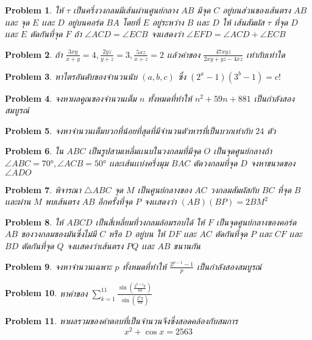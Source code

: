 \documentclass[a4paper,12pt]{article}
\newtheorem{problem}{Problem}
\begin{document}
	\begin{problem}
		ให้ $\tau$ เป็นครึ่งวงกลมมีเส้นผ่านศูนย์กลาง $AB$ มีจุด $C$ อยู่บนส่วนของเส้นตรง $AB$ เเละ จุด $E$ เเละ $D$ อยู่บนคอร์ด $BA$ โดยที่ $E$ อยู่ระหว่าง $B$ เเละ $D$ ให้ เส้นสัมผัส $\tau$ ที่จุด $D$ เเละ $E$ ตัดกันที่จุด $F$ ถ้า $\angle{ACD}= \angle{ECB}$ จงเเสดงว่า $\angle{EFD} = \angle{ACD} + \angle{ECB}$
	\end{problem}
	\begin{problem}
		ถ้า $\frac{3xy}{x+y}=4, \frac{2yz}{y+z}=3, \frac{5xz}{x+z}=2$ เเล้วค่าของ $\frac{47xyz}{2xy+yz-4xz}$ เท่ากับเท่าใด
	\end{problem}
	\begin{problem} หาไตรอันดับของจำนวนนับ $(a,b,c)$ ซึ่ง $(2^a-1)(3^b-1)=c!$

	\end{problem}
	\begin{problem}
		จงหาผลคูณของจำนวนเต็ม $n$ ทั้งหมดที่ทำให้ $n^2+59n+881$ เป็นกำลังสองสมบูรณ์
	\end{problem}
	\begin{problem}
		จงหาจำนวนเต็มบวกที่น้อยที่สุดที่มีจำนวนตัวหารที่เป็นบวกเท่ากับ $24$ ตัว
	\end{problem}
	\begin{problem}
		ใน $ABC$ เป็นรูปสามเหลี่มเเนบในวงกลมที่มีจุด $O$ เป็นจุดศูนย์กลางถ้า $\angle{ABC} = \ang{70}, \angle{ACB} = \ang{50}$ เเละเส้นเเบ่งครึ่งมุม $BAC$ ตัดวงกลมที่จุด $D$ จงหาขนาดของ $\angle{ADO}$
	\end{problem}
	\begin{problem}
		พิจารณา $\bigtriangleup{ABC}$ จุด $M$ เป็นศูนย์กลางของ $AC$ วงกลมสัมผัสกับ $BC$ ที่จุด $B$ เเละผ่าน $M$ พบเส้นตรง $AB$ อีกครั้งที่จุด $P$ จงเเสดงว่า $(AB)(BP) = 2BM^2$
	\end{problem}
	\begin{problem}
		ให้ $ABCD$ เป็นสี่เหลี่ยมที่วงกลมล้อมรอบได้ ให้ $F$ เป็นจุดศูนย์กลางของคอร์ด $AB$ ของวงกลมของมันซึ่งไม่มี $C$ หรือ $D$ อยู่บน ให้ $DF$ เเละ $AC$ ตัดกันที่จุด $P$ เเละ $CF$ เเละ $BD$ ตัดกันที่จุด $Q$ จงเเสดงว่าเส้นตรง $PQ$ เเละ $AB$ ขนานกัน
	\end{problem}
	\begin{problem}
		จงหาจำนวนเฉพาะ $p$ ทั้งหมดที่ทำให้ $\frac{2^{p-1}-1}{p}$ เป็นกำลังสองสมบูรณ์
	\end{problem}
	\begin{problem}
		หาค่าของ $\sum_{k=1}^{11} \frac{\sin(\frac{2^{k+4}\pi}{89})}{\sin(\frac{2^k\pi}{89})}$
	\end{problem}
	\begin{problem}
		หาผลรวมของคำตอบที่เป็นจำนวนจึงซึ่งสอดคล้องกับสมการ  $$x^2+\cos{x} = 2563$$
	\end{problem}
\end{document}
